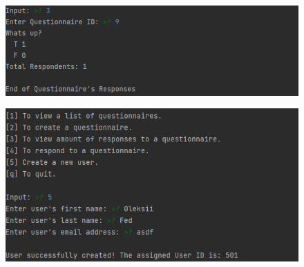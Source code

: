 \documentclass[12pt, oneside]{article}
\begin{document}
    \FloatBarrier
    \begin{figure}[H] 
        \centerline{
        \includegraphics[scale=0.7]{console_stats.PNG}
        }
    \end{figure}
    \FloatBarrier
    \begin{figure}[H] 
        \centerline{
        \includegraphics[scale=0.7]{console_create_user.PNG}
        }
    \end{figure}

\end{document}
